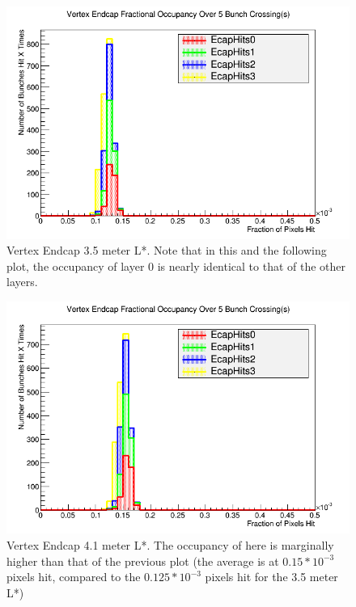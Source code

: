 \documentclass{report}
\begin{document}
                \begin{figure}[H]
                    \centering
                    \includegraphics[height=.4\textheight]{Voccupancy_sidloi3_IR_realign_preqd0shift_5B_ps30_1510212229_ecp}
                    \caption{Vertex Endcap 3.5 meter L*. Note that in this and the following plot,
                            the occupancy of layer 0 is nearly identical to that of the other layers.}
                    \label{fig__lstar_vertex_ecp_3.5}
                \end{figure}
                \begin{figure}[H]
                    \includegraphics[height=.4\textheight]{Voccupancy_sidloi3_IR_realign_5B_ps30_1510211229_ecp}
                    \centering
                    \caption{Vertex Endcap 4.1 meter L*. The occupancy of here is 
                            marginally higher than that of the previous plot 
                            (the average is at $0.15*10^{-3}$ pixels hit,
                             compared to the $0.125*10^{-3}$ pixels hit for the 3.5 meter L*)}
                    \label{fig__lstar_vertex_ecp_4.1}
                \end{figure}
\end{document}
